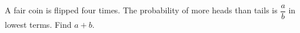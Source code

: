 A fair coin is flipped four times. The probability of more heads than tails is $\dfrac{a}{b}$ in lowest terms. Find $a+b$.
